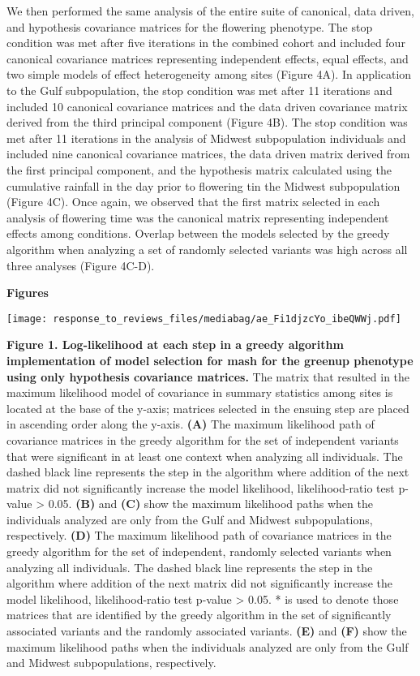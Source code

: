 \documentclass[
  letterpaper,
  DIV=11,
  numbers=noendperiod]{scrartcl}
\begin{document}
We then performed the same analysis of the entire suite of canonical,
data driven, and hypothesis covariance matrices for the flowering
phenotype. The stop condition was met after five iterations in the
combined cohort and included four canonical covariance matrices
representing independent effects, equal effects, and two simple models
of effect heterogeneity among sites (Figure 4A). In application to the
Gulf subpopulation, the stop condition was met after 11 iterations and
included 10 canonical covariance matrices and the data driven covariance
matrix derived from the third principal component (Figure 4B). The stop
condition was met after 11 iterations in the analysis of Midwest
subpopulation individuals and included nine canonical covariance
matrices, the data driven matrix derived from the first principal
component, and the hypothesis matrix calculated using the cumulative
rainfall in the day prior to flowering tin the Midwest subpopulation
(Figure 4C). Once again, we observed that the first matrix selected in
each analysis of flowering time was the canonical matrix representing
independent effects among conditions. Overlap between the models
selected by the greedy algorithm when analyzing a set of randomly
selected variants was high across all three analyses (Figure 4C-D).

\hfill\break

\textbf{Figures}

\hfill\break
\hfill\break

\texttt{[image: response\_to\_reviews\_files/mediabag/ae\_Fi1djzcYo\_ibeQWWj.pdf]}

\textbf{Figure 1. Log-likelihood at each step in a greedy algorithm
implementation of model selection for mash for the greenup phenotype
using only hypothesis covariance matrices.} The matrix that resulted in
the maximum likelihood model of covariance in summary statistics among
sites is located at the base of the y-axis; matrices selected in the
ensuing step are placed in ascending order along the y-axis.
\textbf{(A)} The maximum likelihood path of covariance matrices in the
greedy algorithm for the set of independent variants that were
significant in at least one context when analyzing all individuals. The
dashed black line represents the step in the algorithm where addition of
the next matrix did not significantly increase the model likelihood,
likelihood-ratio test p-value \textgreater{} 0.05. \textbf{(B)} and
\textbf{(C)} show the maximum likelihood paths when the individuals
analyzed are only from the Gulf and Midwest subpopulations,
respectively. \textbf{(D)} The maximum likelihood path of covariance
matrices in the greedy algorithm for the set of independent, randomly
selected variants when analyzing all individuals. The dashed black line
represents the step in the algorithm where addition of the next matrix
did not significantly increase the model likelihood, likelihood-ratio
test p-value \textgreater{} 0.05. * is used to denote those matrices
that are identified by the greedy algorithm in the set of significantly
associated variants and the randomly associated variants. \textbf{(E)}
and \textbf{(F)} show the maximum likelihood paths when the individuals
analyzed are only from the Gulf and Midwest subpopulations,
respectively.
\end{document}
